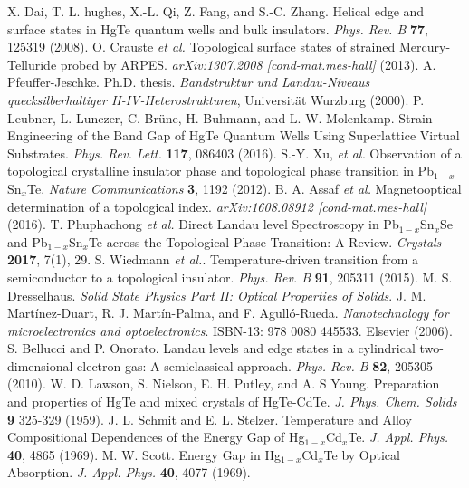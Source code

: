\documentclass[titlepage,a4paper]{book}
\begin{document}
\begin{thebibliography}{199}
X. Dai, T. L. hughes, X.-L. Qi, Z. Fang, and S.-C. Zhang. Helical edge and surface states in HgTe quantum wells and bulk insulators. \textit{Phys. Rev. B} \textbf{77}, 125319 (2008). 
O. Crauste \textit{et al.} Topological surface states of strained Mercury-Telluride probed by ARPES. \textit{arXiv:1307.2008 [cond-mat.mes-hall]} (2013).
A. Pfeuffer-Jeschke. Ph.D. thesis. \textit{Bandstruktur und Landau-Niveaus quecksilberhaltiger II-IV-Heterostrukturen}, Universität Wurzburg (2000).
P. Leubner, L. Lunczer, C. Brüne, H. Buhmann, and L. W. Molenkamp. Strain Engineering of the Band Gap of HgTe Quantum Wells Using Superlattice Virtual Substrates. \textit{Phys. Rev. Lett.} \textbf{117}, 086403 (2016).
S.-Y. Xu, \textit{et al.} Observation of a topological crystalline insulator phase and topological phase transition in Pb$_{1-x}$Sn$_{x}$Te. \textit{Nature Communications} \textbf{3}, 1192 (2012).
B. A. Assaf \textit{et al.} Magnetooptical determination of a topological index. \textit{arXiv:1608.08912 [cond-mat.mes-hall]} (2016).
T. Phuphachong  \textit{et al.} Direct Landau level Spectroscopy in Pb$_{1-x}$Sn$_x$Se and Pb$_{1-x}$Sn$_x$Te across the Topological Phase Transition: A Review. \textit{Crystals} \textbf{2017}, 7(1), 29.
S. Wiedmann \textit{et al.}. Temperature-driven transition from a semiconductor to a topological insulator. \textit{Phys. Rev. B} \textbf{91}, 205311 (2015).
M. S. Dresselhaus. \textit{Solid State Physics Part II: Optical Properties of Solids}.
J. M. Martínez-Duart, R. J. Martín-Palma, and F. Agulló-Rueda. \textit{Nanotechnology for microelectronics and optoelectronics}. ISBN-13: 978 0080 445533. Elsevier (2006).
S. Bellucci and P. Onorato. Landau levels and edge states in a cylindrical two-dimensional electron gas: A semiclassical approach. \textit{Phys. Rev. B} \textbf{82}, 205305 (2010).
W. D. Lawson, S. Nielson, E. H. Putley, and A. S Young. Preparation and properties of HgTe and mixed crystals of HgTe-CdTe. \textit{J. Phys. Chem. Solids} \textbf{9} 325-329 (1959).
J. L. Schmit and E. L. Stelzer. Temperature and Alloy Compositional Dependences of the Energy Gap of Hg$_{1-x}$Cd$_x$Te. \textit{J. Appl. Phys.} \textbf{40}, 4865 (1969).
M. W. Scott. Energy Gap in Hg$_{1-x}$Cd$_x$Te by Optical Absorption. \textit{J. Appl. Phys.} \textbf{40}, 4077 (1969).

\end{thebibliography}
\end{document}
